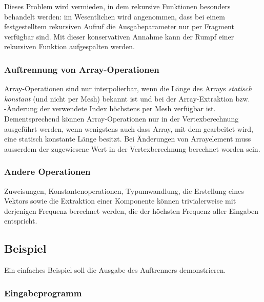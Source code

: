 \documentclass[twoside,a4paper,fleqn,12pt]{book}
\begin{document}
Dieses Problem wird vermieden, in dem rekursive Funktionen besonders behandelt werden: im Wesentlichen wird angenommen,
dass bei einem festgestelltem rekursiven Aufruf die Ausgabeparameter nur per Fragment verfügbar sind.
Mit dieser konservativen Annahme kann der Rumpf einer rekursiven Funktion aufgespalten werden.



% 

\subsubsection{Auftrennung von Array-Operationen}

Array-Operationen sind nur interpolierbar, wenn die Länge des Arrays \emph{statisch konstant}
(und nicht per Mesh) bekannt ist und bei der Array-Extraktion bzw. \mbox{-Än}\-de\-rung der verwendete Index höchstens per Mesh
verfügbar ist. Dementsprechend können Array-Operationen nur in der Vertexberechnung ausgeführt werden,
wenn wenigstens auch dass Array, mit dem gearbeitet wird, eine statisch konstante Länge besitzt.
Bei Änderungen von Arrayelement muss ausserdem der zugewiesene Wert in der Vertexberechnung berechnet worden sein.

\subsubsection{Andere Operationen}

Zuweisungen, Konstantenoperationen, Typumwandlung, die Erstellung eines Vektors sowie
die Extraktion einer Komponente können trivialerweise mit derjenigen Frequenz berechnet werden, die der höchsten Frequenz
aller Eingaben entspricht.

\subsection{Beispiel}

Ein einfaches Beispiel soll die Ausgabe des Auftrenners demonstrieren.

\subsubsection{Eingabeprogramm}
\end{document}
